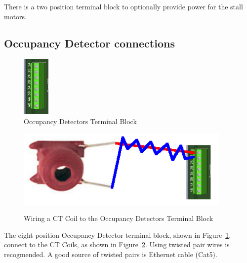 There is a two position terminal block to optionally provide power for the
stall motors.

\subsection{Occupancy Detector connections}
\begin{figure}[hbpt]\begin{centering}%
\includegraphics{ESP32-S3-MultiFunctionOccupancyDetectorsTermBlock.png}
\caption{Occupancy Detectors Terminal Block}
\label{fig:ESP32-S3-MultiFunctionOccupancyDetectorsTermBlock}
\end{centering}\end{figure} 
\begin{figure}[hbpt]\begin{centering}%
\includegraphics[height=1.5in]{ESP32-S3-MultiFunctionOccupancyDetectorsCTCoilWiring.png}
\label{fig:ESP32-S3-MultiFunctionOccupancyDetectorsCTCoilWiring}
\caption{Wiring a CT Coil to the Occupancy Detectors Terminal Block}
\end{centering}\end{figure}

The eight position Occupancy Detector terminal block, shown in 
Figure~\ref{fig:ESP32-S3-MultiFunctionOccupancyDetectorsTermBlock}, connect to 
the CT Coils, as shown in 
Figure~\ref{fig:ESP32-S3-MultiFunctionOccupancyDetectorsCTCoilWiring}.  Using 
twisted pair wires is recogmended.  A good source of twisted pairs is Ethernet 
cable (Cat5).



